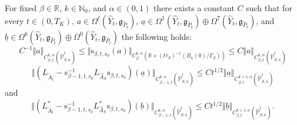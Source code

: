 \documentclass[11pt,a4paper]{scrartcl}
\newcommand{\VertWH}[3]{\Vert_{C^{{#1},\alpha}_{{#2}}{#3}}}
\newcommand{\VertWHt}[3]{\Vert_{C^{{#1},\alpha}_{{#2},t}{#3}}}
\numberwithin{equation}{section}
\theoremstyle{plain}
\theoremstyle{definition}
\theoremstyle{remark}
\begin{document}
\begin{lemma}\label{lem:ALE-rescaling-comparison}
For fixed $\beta\in \mathbb{R}$, $k\in \mathbb{N}_0$, and $\alpha\in(0,1)$ there exists a constant $C$ such that for every $t \in (0,T_K)$, $a \in \Omega^{\ell}(\hat{Y}_t,\mathfrak{g}_{\hat{P}_t})$, $\underline{a} \in \Omega^{1}(\hat{Y}_t,\mathfrak{g}_{\hat{P}_t}) \oplus \Omega^{7}(\hat{Y}_t,\mathfrak{g}_{\hat{P}_t})$, and $\underline{b} \in \Omega^{6}(\hat{Y}_t,\mathfrak{g}_{\hat{P}_t}) \oplus \Omega^{0}(\hat{Y}_t,\mathfrak{g}_{\hat{P}_t})$ the following holds:
\[C^{-1} \Vert a \VertWHt{k}{\beta}{(\hat{\mathcal{V}}_{S,\kappa}^t)} \leq \Vert \mathrm{s}_{\beta,t,s_0} (a) \VertWH{k}{\beta}{(\mathbb{R}\times (t \tau_S)^{-1}(B_\kappa(0)/\Gamma_S))} \leq C\Vert a \VertWHt{k}{\beta}{(\hat{\mathcal{V}}_{S,\kappa}^t)} 
\]
\[
\Vert (L_{\tilde{A}_t} - \mathrm{s}_{\beta-1,t,s_0}^{-1} L_{\hat{A}_S} \mathrm{s}_{\beta,t,s_0})(\underline{a}) \VertWHt{k}{\beta-1}{(\hat{\mathcal{V}}_{S,\kappa}^t)}\leq C t^{1/2} \Vert \underline{a} \VertWHt{k+1}{\beta}{(\hat{\mathcal{V}}_{S,\kappa}^t)}
\]
and 
\[
\Vert (L_{\tilde{A}_t}^* - \mathrm{s}_{\beta-1,t,s_0}^{-1} L_{\hat{A}_S}^* \mathrm{s}_{\beta,t,s_0})(\underline{b}) \VertWHt{k}{\beta-1}{(\hat{\mathcal{V}}_{S,\kappa}^t)}\leq C t^{1/2} \Vert \underline{b} \VertWHt{k+1}{\beta}{(\hat{\mathcal{V}}_{S,\kappa}^t)}.
\]
\end{lemma}
\end{document}
